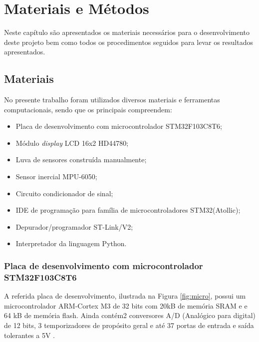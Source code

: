 \chapter{Materiais e Métodos}
Neste capítulo são apresentados os materiais necessários para o desenvolvimento deste projeto bem como todos os procedimentos seguidos para levar os resultados apresentados.

\section{Materiais}
    No presente trabalho foram utilizados diversos materiais e ferramentas computacionais, sendo que os principais compreendem:
	\begin{itemize}
		\item Placa de desenvolvimento com microcontrolador STM32F103C8T6;
		\item Módulo \textit{display} LCD 16x2 HD44780;
		\item Luva de sensores construída manualmente;
		\item Sensor inercial MPU-6050;
		\item Circuito condicionador de sinal;
		\item IDE de programação para família de microcontroladores STM32(Atollic);
		\item Depurador/programador ST-Link/V2;
		\item Interpretador da linguagem Python.
	\end{itemize}

	
	\subsection{Placa de desenvolvimento com microcontrolador STM32F103C8T6}
	
		A referida placa de desenvolvimento, ilustrada na Figura \ref{fig:micro}, possui um microcontrolador ARM-Cortex M3  de 32 bits com 20kB de memória SRAM e e 64 kB de memória flash. Ainda contém2 conversores A/D (Analógico para digital) de 12 bits, 3 temporizadores de propósito geral e até 37 portas de entrada e saída tolerantes a 5V \cite{STM32F103}.
        
